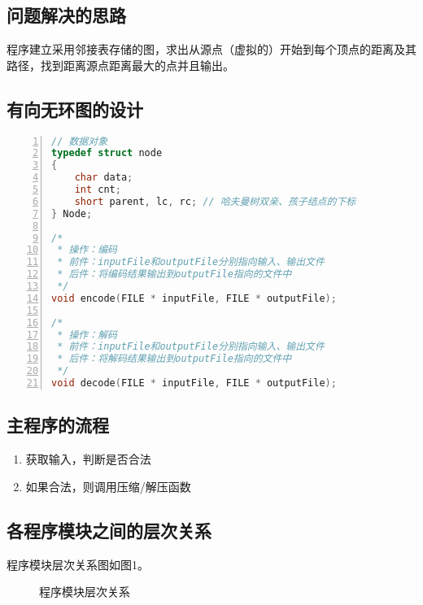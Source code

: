 \documentclass{article}
\begin{document}
\subsection{问题解决的思路}

程序建立采用邻接表存储的图，求出从源点（虚拟的）开始到每个顶点的距离及其路径，找到距离源点距离最大的点并且输出。

\subsection{有向无环图的设计}

\begin{lstlisting}[language={C},
    numbers=left,
    numberstyle=\tiny\consolas,
    basicstyle=\small\consolas]
// 数据对象
typedef struct node
{
    char data;
    int cnt;
    short parent, lc, rc; // 哈夫曼树双亲、孩子结点的下标
} Node;

/*
 * 操作：编码
 * 前件：inputFile和outputFile分别指向输入、输出文件
 * 后件：将编码结果输出到outputFile指向的文件中
 */
void encode(FILE * inputFile, FILE * outputFile);

/*
 * 操作：解码
 * 前件：inputFile和outputFile分别指向输入、输出文件
 * 后件：将解码结果输出到outputFile指向的文件中
 */
void decode(FILE * inputFile, FILE * outputFile);
\end{lstlisting}

\subsection{主程序的流程}

\begin{enumerate}
    \item 获取输入，判断是否合法
    \item 如果合法，则调用压缩/解压函数
\end{enumerate}

\subsection{各程序模块之间的层次关系}

程序模块层次关系图如图1。

\begin{figure}[htbp]


    \caption{程序模块层次关系}

\end{figure}
\end{document}
